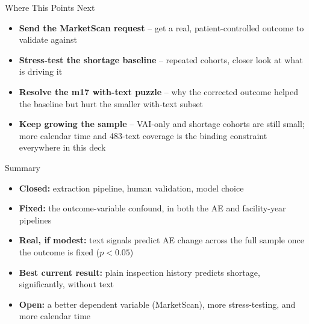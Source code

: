 \documentclass[aspectratio=169,10pt]{beamer}
\begin{document}
\begin{frame}{Where This Points Next}
\begin{itemize}
  \setlength{\itemsep}{9pt}
  \item \textbf{Send the MarketScan request} -- get a real, patient-controlled
        outcome to validate against
  \item \textbf{Stress-test the shortage baseline} -- repeated cohorts, closer
        look at what is driving it
  \item \textbf{Resolve the m17 with-text puzzle} -- why the corrected outcome
        helped the baseline but hurt the smaller with-text subset
  \item \textbf{Keep growing the sample} -- VAI-only and shortage cohorts are
        still small; more calendar time and 483-text coverage is the binding
        constraint everywhere in this deck
\end{itemize}
\end{frame}

\begin{frame}{Summary}
\begin{itemize}
  \setlength{\itemsep}{9pt}
  \item \textbf{Closed:} extraction pipeline, human validation, model choice
  \item \textbf{Fixed:} the outcome-variable confound, in both the AE and
        facility-year pipelines
  \item \textbf{Real, if modest:} text signals predict AE change across the full
        sample once the outcome is fixed ($p<0.05$)
  \item \textbf{Best current result:} plain inspection history predicts
        shortage, significantly, without text
  \item \textbf{Open:} a better dependent variable (MarketScan), more stress-testing,
        and more calendar time
\end{itemize}
\end{frame}
\end{document}
